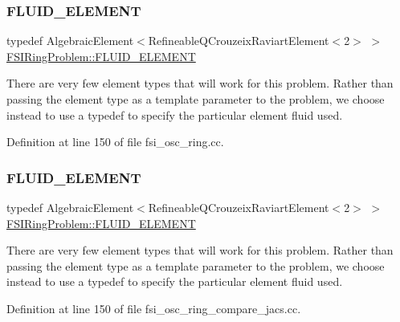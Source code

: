 \subsubsection{\texorpdfstring{F\+L\+U\+I\+D\+\_\+\+E\+L\+E\+M\+E\+NT}{FLUID\_ELEMENT}\hspace{0.1cm}{\footnotesize\ttfamily [1/2]}}
{\footnotesize\ttfamily typedef Algebraic\+Element$<$Refineable\+Q\+Crouzeix\+Raviart\+Element$<$2$>$ $>$ \hyperlink{classFSIRingProblem_a2ce9ba3122272853bfa6ec3fcf39b78a}{F\+S\+I\+Ring\+Problem\+::\+F\+L\+U\+I\+D\+\_\+\+E\+L\+E\+M\+E\+NT}\hspace{0.3cm}{\ttfamily [private]}}



There are very few element types that will work for this problem. Rather than passing the element type as a template parameter to the problem, we choose instead to use a typedef to specify the particular element fluid used. 



Definition at line 150 of file fsi\+\_\+osc\+\_\+ring.\+cc.

\mbox{\label{classFSIRingProblem_a2ce9ba3122272853bfa6ec3fcf39b78a}} 
\subsubsection{\texorpdfstring{F\+L\+U\+I\+D\+\_\+\+E\+L\+E\+M\+E\+NT}{FLUID\_ELEMENT}\hspace{0.1cm}{\footnotesize\ttfamily [2/2]}}
{\footnotesize\ttfamily typedef Algebraic\+Element$<$Refineable\+Q\+Crouzeix\+Raviart\+Element$<$2$>$ $>$ \hyperlink{classFSIRingProblem_a2ce9ba3122272853bfa6ec3fcf39b78a}{F\+S\+I\+Ring\+Problem\+::\+F\+L\+U\+I\+D\+\_\+\+E\+L\+E\+M\+E\+NT}\hspace{0.3cm}{\ttfamily [private]}}



There are very few element types that will work for this problem. Rather than passing the element type as a template parameter to the problem, we choose instead to use a typedef to specify the particular element fluid used. 



Definition at line 150 of file fsi\+\_\+osc\+\_\+ring\+\_\+compare\+\_\+jacs.\+cc.

